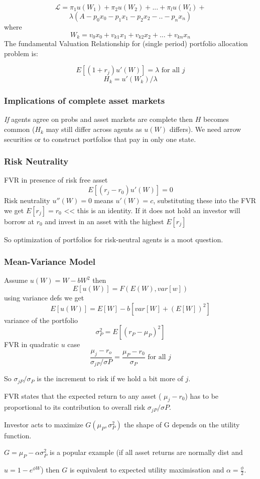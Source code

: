 \[\mathcal{L}=\pi_1u(W_1)+\pi_2u(W_2)+...+\pi_lu(W_l)+\]
\[\lambda(A-p_0x_0-p_1x_1-p_2x_2-..-p_nx_n)\]
where
\[W_k=v_0x_0+v_{k1}x_1+v_{k2}x_2+...+v_{kn}x_n\]
The fundamental Valuation Relationship for (single period) portfolio allocation
problem is:

\[E[(1+r_j)u'(W)]=\lambda \mbox{ for all } j\]
\[H_k=u'(W_k)/\lambda\]
\subsubsection*{Implications of complete asset markets}
\emph{If} agents agree on probs and asset markets are complete then $H$ becomes
common ($H_k$ may still differ across agents as $u(W)$ differs). We need arrow
securities or to construct portfolios that pay in only one state.

\subsubsection*{Risk Neutrality}
FVR in presence of risk free asset
\[E[(r_j-r_0)u'(W)]=0\]
Risk neutrality $u''(W)=0$ means $u'(W)=c$, substituting these into the FVR we
get $E[r_j]=r_0$ << this is an identity. If it does not hold an investor will
borrow at $r_0$ and invest in an asset with the highest $E[r_j]$

So optimization of portfolios for risk-neutral agents is a moot question.

\subsubsection*{Mean-Variance Model}
Assume $u(W)=W-bW^2$ then
\[E[u(W)]=F(E(W),var[w])\]
using variance defs we get 
\[E[u(W)]=E[W]-b[var[W]+(E[W])^2]\]
variance of the portfolio
\[\sigma^2_P=E[(r_P-\mu_P)^2]\]
FVR in quadratic $u$ case
\[\frac{\mu_j-r_o}{\sigma_{jP}/\sigma{P}}=\frac{\mu_P-r_0}{\sigma_P}\mbox{ for
all } j\]

So $\sigma_{jP}/\sigma_P$ is the increment to risk if we hold a bit more of
$j$.

FVR states that the expected return to any asset ( $\mu_j - r_0$) has to be
proportional to its contribution to overall risk $\sigma_{jP}/\sigma{P}$.

Investor acts to maximize $G(\mu_P,\sigma^2_P)$ the shape of G depends on the
utility function. 

$G=\mu_P-\alpha \sigma^2_P$ is a popular example (if all asset returns are
normally dist and 

$u=1-e^{\phi W}$) then $G$ is equivalent to expected utility maximisation and
$\alpha=\frac{\phi}{2}$. 

